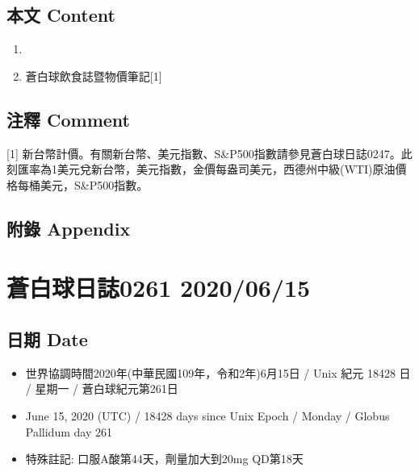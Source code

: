 \documentclass[a5paper, 11pt
]{book}
\providecommand{\tightlist}{%
  \setlength{\itemsep}{0pt}\setlength{\parskip}{0pt}}
\begin{document}
\hypertarget{ux672cux6587-content-13}{%
\subsection{本文 Content}\label{ux672cux6587-content-13}}

\begin{enumerate}
\def\labelenumi{\arabic{enumi}.}
\tightlist
\item
\item
  蒼白球飲食誌暨物價筆記{[}1{]}
\end{enumerate}

\hypertarget{ux6ce8ux91cb-comment-13}{%
\subsection{注釋 Comment}\label{ux6ce8ux91cb-comment-13}}

{[}1{]}
新台幣計價。有關新台幣、美元指數、S\&P500指數請參見蒼白球日誌0247。此刻匯率為1美元兌新台幣，美元指數，金價每盎司美元，西德州中級(WTI)原油價格每桶美元，S\&P500指數。

\hypertarget{ux9644ux9304-appendix-13}{%
\subsection{附錄 Appendix}\label{ux9644ux9304-appendix-13}}

\hypertarget{ux84bcux767dux7403ux65e5ux8a8c0261-20200615}{%
\section{蒼白球日誌0261
2020/06/15}\label{ux84bcux767dux7403ux65e5ux8a8c0261-20200615}}

\hypertarget{ux65e5ux671f-date-14}{%
\subsection{日期 Date}\label{ux65e5ux671f-date-14}}

\begin{itemize}
\tightlist
\item
  世界協調時間2020年(中華民國109年，令和2年)6月15日 / Unix 紀元 18428 日
  / 星期一 / 蒼白球紀元第261日
\item
  June 15, 2020 (UTC) / 18428 days since Unix Epoch / Monday / Globus
  Pallidum day 261
\item
  特殊註記: 口服A酸第44天，劑量加大到20mg QD第18天
\end{itemize}
\end{document}
